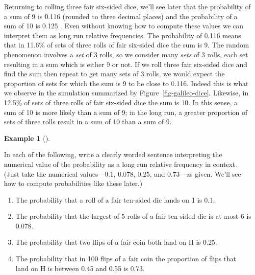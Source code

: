 \documentclass[
  letterpaper,
  DIV=11,
  numbers=noendperiod]{scrreprt}
\providecommand{\tightlist}{%
  \setlength{\itemsep}{0pt}\setlength{\parskip}{0pt}}
\theoremstyle{plain}
\theoremstyle{definition}
\newtheorem{example}{Example}[chapter]
\theoremstyle{definition}
\theoremstyle{definition}
\theoremstyle{remark}
\begin{document}
Returning to rolling three fair six-sided dice, we'll see later that the
probability of a sum of 9 is 0.116 (rounded to three decimal places) and
the probability of a sum of 10 is 0.125 . Even without knowing how to
compute these values we can interpret them as long run relative
frequencies. The probability of 0.116 means that in 11.6\% of sets of
three rolls of fair six-sided dice the sum is 9. The random phenomenon
involves a \emph{set} of 3 rolls, so we consider many \emph{sets} of 3
rolls, each set resulting in a sum which is either 9 or not. If we roll
three fair six-sided dice and find the sum then repeat to get many sets
of 3 rolls, we would expect the proportion of sets for which the sum is
9 to be close to 0.116. Indeed this is what we observe in the simulation
summarized by Figure~\ref{fig-galileo-dice}. Likewise, in 12.5\% of sets
of three rolls of fair six-sided dice the sum is 10. In this sense, a
sum of 10 is more likely than a sum of 9; in the long run, a greater
proportion of sets of three rolls result in a sum of 10 than a sum of 9.

\begin{tcolorbox}[enhanced jigsaw, opacityback=0, left=2mm, colframe=quarto-callout-note-color-frame, toprule=.15mm, breakable, colback=white, leftrule=.75mm, arc=.35mm, rightrule=.15mm, bottomrule=.15mm]

\begin{example}[]\protect\hypertarget{exm-interpret-rel-freq}{}\label{exm-interpret-rel-freq}

In each of the following, write a clearly worded sentence interpreting
the numerical value of the probability as a long run relative frequency
in context. (Just take the numerical values---0.1, 0.078, 0.25, and
0.73---as given. We'll see how to compute probabilities like these
later.)

\begin{enumerate}
\def\labelenumi{\arabic{enumi}.}
\tightlist
\item
  The probability that a roll of a fair ten-sided die lands on 1 is 0.1.
\item
  The probability that the largest of 5 rolls of a fair ten-sided die is
  at most 6 is 0.078.
\item
  The probability that two flips of a fair coin both land on H is 0.25.
\item
  The probability that in 100 flips of a fair coin the proportion of
  flips that land on H is between 0.45 and 0.55 is 0.73.
\end{enumerate}

\end{example}

\end{tcolorbox}
\end{document}
